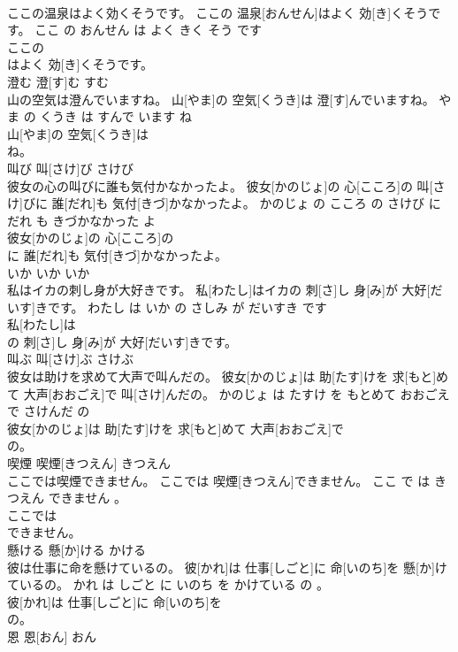 \documentclass[8pt]{extreport}
\begin{document}
\begin{CJK}{UTF8}{min}
\\	ここの温泉はよく効くそうです。	ここの 温泉[おんせん]はよく 効[き]くそうです。	ここ の おんせん は よく きく そう です	
\\	ここの
\\	はよく 効[き]くそうです。			
\\	澄む	澄[す]む	すむ	
\\	山の空気は澄んでいますね。	山[やま]の 空気[くうき]は 澄[す]んでいますね。	やま の くうき は すんで います ね	
\\	山[やま]の 空気[くうき]は
\\	ね。			
\\	叫び	叫[さけ]び	さけび	
\\	彼女の心の叫びに誰も気付かなかったよ。	彼女[かのじょ]の 心[こころ]の 叫[さけ]びに 誰[だれ]も 気付[きづ]かなかったよ。	かのじょ の こころ の さけび に だれ も きづかなかった よ	
\\	彼女[かのじょ]の 心[こころ]の
\\	に 誰[だれ]も 気付[きづ]かなかったよ。			
\\	いか	いか	いか	
\\	私はイカの刺し身が大好きです。	私[わたし]はイカの 刺[さ]し 身[み]が 大好[だいす]きです。	わたし は いか の さしみ が だいすき です	
\\	私[わたし]は
\\	の 刺[さ]し 身[み]が 大好[だいす]きです。			
\\	叫ぶ	叫[さけ]ぶ	さけぶ	
\\	彼女は助けを求めて大声で叫んだの。	彼女[かのじょ]は 助[たす]けを 求[もと]めて 大声[おおごえ]で 叫[さけ]んだの。	かのじょ は たすけ を もとめて おおごえ で さけんだ の	
\\	彼女[かのじょ]は 助[たす]けを 求[もと]めて 大声[おおごえ]で
\\	の。			
\\	喫煙	喫煙[きつえん]	きつえん	
\\	ここでは喫煙できません。	ここでは 喫煙[きつえん]できません。	ここ で は きつえん できません 。	
\\	ここでは
\\	できません。			
\\	懸ける	懸[か]ける	かける	
\\	彼は仕事に命を懸けているの。	彼[かれ]は 仕事[しごと]に 命[いのち]を 懸[か]けているの。	かれ は しごと に いのち を かけている の 。	
\\	彼[かれ]は 仕事[しごと]に 命[いのち]を
\\	の。			
\\	恩	恩[おん]	おん	

\end{CJK}
\end{document}
